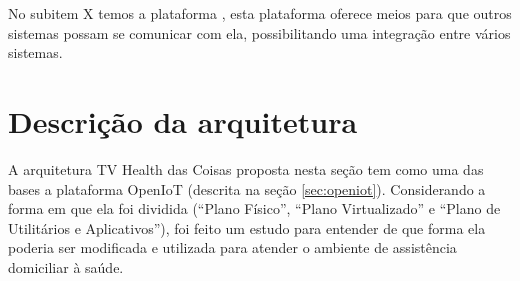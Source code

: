 No subitem X temos a plataforma \nextsaude[], esta plataforma oferece meios
para que outros sistemas possam se comunicar com ela, possibilitando uma
integração entre vários sistemas.






\section{Descrição da arquitetura}
\label{sec:descricao-solucao}

A arquitetura TV Health das Coisas proposta nesta seção tem como uma das bases
a plataforma OpenIoT (descrita na seção \vref{sec:openiot}). Considerando a
forma em que ela foi dividida (``Plano Físico'', ``Plano Virtualizado'' e
``Plano de Utilitários e Aplicativos''), foi feito um estudo para entender de
que forma ela poderia ser modificada e utilizada para atender o ambiente de
assistência domiciliar à saúde.

